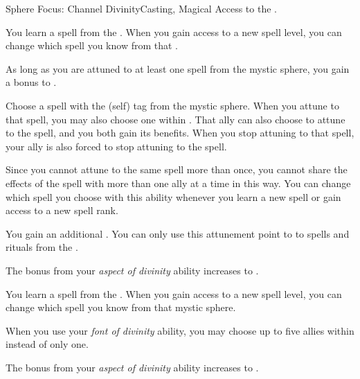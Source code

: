     \begin{feat}{Sphere Focus: Channel Divinity}{Casting, Magical}
        \featpre Access to the  .

         You learn a spell from the  .
        When you gain access to a new spell level, you can change which spell you know from that .

         As long as you are attuned to at least one spell from the  mystic sphere, you gain a  bonus to .

         Choose a spell with the  (self) tag from the  mystic sphere.
        When you attune to that spell, you may also choose one  within \medrange.
        That ally can also choose to attune to the spell, and you both gain its benefits.
        When you stop attuning to that spell, your ally is also forced to stop attuning to the spell.

        Since you cannot attune to the same spell more than once, you cannot share the effects of the spell with more than one ally at a time in this way.
        You can change which spell you choose with this ability whenever you learn a new spell or gain access to a new spell rank.

         You gain an additional .
        You can only use this attunement point to  to spells and rituals from the  .

         The bonus from your \textit{aspect of divinity} ability increases to .

         You learn a spell from the  .
        When you gain access to a new spell level, you can change which spell you know from that mystic sphere.

         When you use your \textit{font of divinity} ability, you may choose up to five allies within \medrange instead of only one.

         The bonus from your \textit{aspect of divinity} ability increases to .
    \end{feat}

